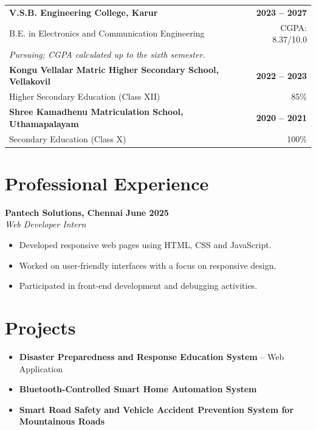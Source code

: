 \documentclass[10pt,a4paper]{article}
\begin{document}
\begin{tabularx}{\textwidth}{X r}
\textbf{V.S.B. Engineering College, Karur}
& \textbf{2023 -- 2027} \\
B.E. in Electronics and Communication Engineering
& CGPA: 8.37/10.0 \\
\multicolumn{2}{l}{\textit{Pursuing; CGPA calculated up to the sixth semester.}}
\\[4pt]

\textbf{Kongu Vellalar Matric Higher Secondary School, Vellakovil}
& \textbf{2022 -- 2023} \\
Higher Secondary Education (Class XII)
& 85\% \\[4pt]

\textbf{Shree Kamadhenu Matriculation School, Uthamapalayam}
& \textbf{2020 -- 2021} \\
Secondary Education (Class X)
& 100\%
\end{tabularx}


\section*{Professional Experience}

\textbf{Pantech Solutions, Chennai}
\hfill \textbf{June 2025}\\
\textit{Web Developer Intern}

\begin{itemize}
    \item Developed responsive web pages using HTML,
    CSS and JavaScript.
    \item Worked on user-friendly interfaces with a focus
    on responsive design.
    \item Participated in front-end development and
    debugging activities.
\end{itemize}


\section*{Projects}

\begin{itemize}
    \item \textbf{Disaster Preparedness and Response
    Education System} -- Web Application

    \item \textbf{Bluetooth-Controlled Smart Home
    Automation System}

    \item \textbf{Smart Road Safety and Vehicle Accident
    Prevention System for Mountainous Roads}
\end{itemize}
\end{document}
